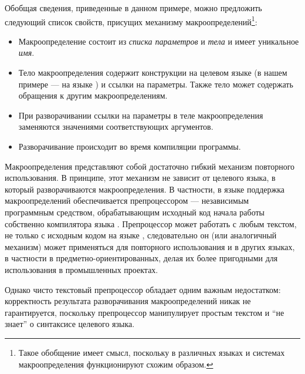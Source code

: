 Обобщая сведения, приведенные в данном примере, можно предложить следующий список свойств, присущих механизму макроопределений\footnote{Такое обобщение имеет смысл, поскольку в различных языках и системах макроопределения функционируют схожим образом.}:
\begin{itemize}
\item Макроопределение состоит из \emph{списка параметров} и \emph{тела} и имеет уникальное \emph{имя}.
\item Тело макроопределения содержит конструкции на целевом языке (в нашем примере --- на языке ) и ссылки на параметры. Также тело может содержать обращения к другим макроопределениям.
\item При разворачивании ссылки на параметры в теле макроопределения заменяются значениями соответствующих аргументов.
\item Разворачивание происходит во время компиляции программы.
\end{itemize}

Макроопределения представляют собой достаточно гибкий механизм повторного использования. В принципе, этот механизм не зависит от целевого языка, в который разворачиваются макроопределения. В частности, в языке  поддержка макроопределений обеспечивается препроцессором  --- независимым программным средством, обрабатывающим исходный код  начала работы собственно компилятора языка . Препроцессор  может работать с любым текстом, не только с исходным кодом на языке , следовательно он (или аналогичный механизм) может применяться для повторного использования и в других языках, в частности в предметно-ориентированных, делая их более пригодными для использования в промышленных проектах.

Однако чисто текстовый препроцессор обладает одним важным недостатком: корректность результата разворачивания макроопределений никак не гарантируется, поскольку препроцессор манипулирует простым текстом и ``не знает'' о синтаксисе целевого языка.

